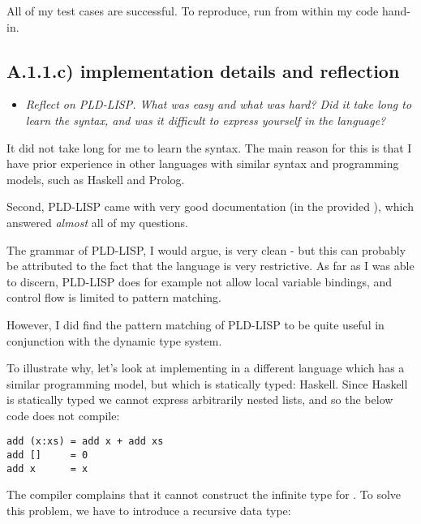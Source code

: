All of my test cases are successful. To reproduce, run  from within my
code hand-in.

\sectend


\newpage
\subsection{A.1.1.c) implementation details and reflection}

\begin{itemize}
  \item \emph{Reflect on PLD-LISP. What was easy and what was hard? Did it take
    long to learn the syntax, and was it difficult to express yourself in the
    language?}
\end{itemize}

It did not take long for me to learn the syntax. The main reason for this is
that I have prior experience in other languages with similar syntax and
programming models, such as Haskell and Prolog. \smallskip

Second, PLD-LISP came with very good documentation (in the provided
), which answered \emph{almost} all of my questions.

\bigskip

The grammar of PLD-LISP, I would argue, is very clean - but this can probably be
attributed to the fact that the language is very restrictive. As far as I was
able to discern, PLD-LISP does for example not allow local variable bindings,
and control flow is limited to pattern matching.

\bigskip

However, I did find the pattern matching of PLD-LISP to be quite useful in
conjunction with the dynamic type system.

\smallskip

To illustrate why, let's look at implementing  in a different language
which has a similar programming model, but which is statically typed: Haskell.
Since Haskell is statically typed we cannot express arbitrarily nested lists,
and so the below code does not compile:

\begin{verbatim}
add (x:xs) = add x + add xs
add []     = 0
add x      = x
\end{verbatim}

The compiler complains that it cannot construct the infinite type for .
To solve this problem, we have to introduce a recursive data type:

